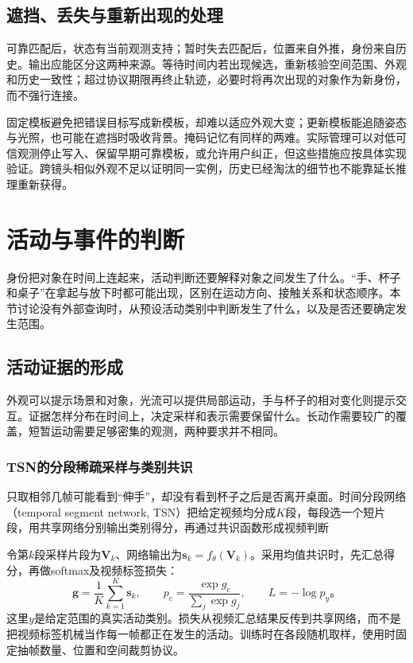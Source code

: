\subsection{遮挡、丢失与重新出现的处理}
\label{sec:vision-video-recovery}

可靠匹配后，状态有当前观测支持；暂时失去匹配后，位置来自外推，身份来自历史。输出应能区分这两种来源。等待时间内若出现候选，重新核验空间范围、外观和历史一致性；超过协议期限再终止轨迹，必要时将再次出现的对象作为新身份，而不强行连接。

固定模板避免把错误目标写成新模板，却难以适应外观大变；更新模板能追随姿态与光照，也可能在遮挡时吸收背景。掩码记忆有同样的两难。实际管理可以对低可信观测停止写入、保留早期可靠模板，或允许用户纠正，但这些措施应按具体实现验证。跨镜头相似外观不足以证明同一实例，历史已经淘汰的细节也不能靠延长推理重新获得。

\section{活动与事件的判断}
\label{sec:vision-video-activities}

身份把对象在时间上连起来，活动判断还要解释对象之间发生了什么。“手、杯子和桌子”在拿起与放下时都可能出现，区别在运动方向、接触关系和状态顺序。本节讨论没有外部查询时，从预设活动类别中判断发生了什么，以及是否还要确定发生范围。

\subsection{活动证据的形成}
\label{sec:vision-video-activity-evidence}

外观可以提示场景和对象，光流可以提供局部运动，手与杯子的相对变化则提示交互。证据怎样分布在时间上，决定采样和表示需要保留什么。长动作需要较广的覆盖，短暂运动需要足够密集的观测，两种要求并不相同。

\subsubsection{TSN的分段稀疏采样与类别共识}
\label{sec:vision-video-tsn}

只取相邻几帧可能看到“伸手”，却没有看到杯子之后是否离开桌面。时间分段网络（temporal segment network, TSN）把给定视频均分成$K$段，每段选一个短片段，用共享网络分别输出类别得分，再通过共识函数形成视频判断

令第$k$段采样片段为$\bm{V}_k$、网络输出为$\bm{s}_k=f_\theta(\bm{V}_k)$。采用均值共识时，先汇总得分，再做softmax及视频标签损失：
\begin{equation}
  \bm{g}=\frac{1}{K}\sum_{k=1}^{K}\bm{s}_k,\qquad
  p_c=\frac{\exp g_c}{\sum_j\exp g_j},\qquad
  L=-\log p_y\text{。}
  \label{eq:vision-video-tsn}
\end{equation}
这里$y$是给定范围的真实活动类别。损失从视频汇总结果反传到共享网络，而不是把视频标签机械当作每一帧都正在发生的活动。训练时在各段随机取样，使用时固定抽帧数量、位置和空间裁剪协议。

